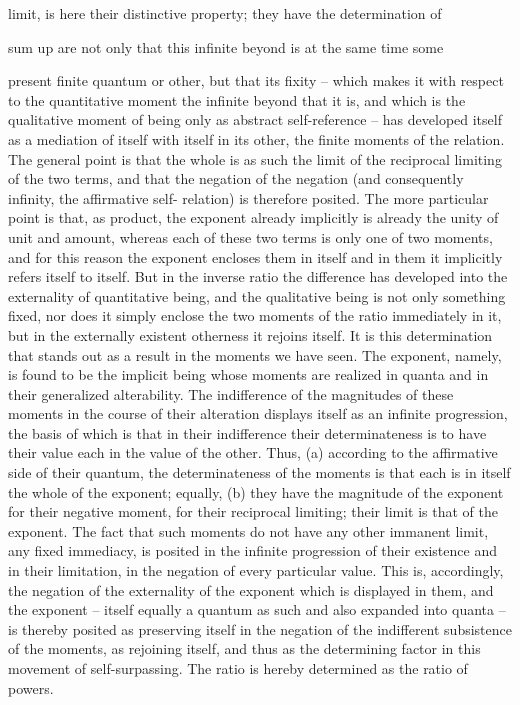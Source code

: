 limit, is here their distinctive property; they have the determination of

sum up are not only that this infinite beyond is at the same time some

present finite quantum or other, but that its fixity – which makes it with
respect to the quantitative moment the infinite beyond that it is, and
which is the qualitative moment of being only as abstract self-reference –
has developed itself as a mediation of itself with itself in its other, the
finite moments of the relation. The general point is that the whole is as
such the limit of the reciprocal limiting of the two terms, and that the
negation of the negation (and consequently infinity, the affirmative self-
relation) is therefore posited. The more particular point is that, as product,
the exponent already implicitly is already the unity of unit and amount,
whereas each of these two terms is only one of two moments, and for
this reason the exponent encloses them in itself and in them it implicitly
refers itself to itself. But in the inverse ratio the difference has developed
into the externality of quantitative being, and the qualitative being is not
only something fixed, nor does it simply enclose the two moments of the
ratio immediately in it, but in the externally existent otherness it rejoins itself.
It is this determination that stands out as a result in the moments we
have seen. The exponent, namely, is found to be the implicit being whose
moments are realized in quanta and in their generalized alterability. The
indifference of the magnitudes of these moments in the course of their
alteration displays itself as an infinite progression, the basis of which is
that in their indifference their determinateness is to have their value each
in the value of the other. Thus, (a) according to the affirmative side of
their quantum, the determinateness of the moments is that each is in itself
the whole of the exponent; equally, (b) they have the magnitude of the
exponent for their negative moment, for their reciprocal limiting; their
limit is that of the exponent. The fact that such moments do not have
any other immanent limit, any fixed immediacy, is posited in the infinite
progression of their existence and in their limitation, in the negation of
every particular value. This is, accordingly, the negation of the externality
of the exponent which is displayed in them, and the exponent – itself
equally a quantum as such and also expanded into quanta – is thereby
posited as preserving itself in the negation of the indifferent subsistence of
the moments, as rejoining itself, and thus as the determining factor in this
movement of self-surpassing.
The ratio is hereby determined as the ratio of powers.

